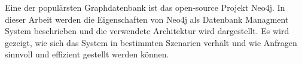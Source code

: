 Eine der populärsten Graphdatenbank ist das open-source Projekt Neo4j\parencite{francis2018cypher}.  \newline In dieser Arbeit werden die Eigenschaften von Neo4j als Datenbank Managment System beschrieben und die verwendete Architektur wird dargestellt. Es wird gezeigt, wie sich das System in bestimmten Szenarien verhält und wie Anfragen sinnvoll und effizient gestellt werden können. 

